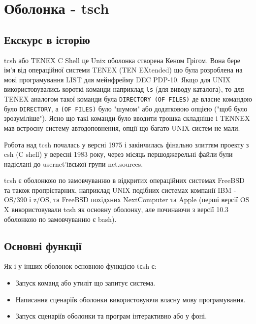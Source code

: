 \section{Оболонка - tsch}

  \subsection{Екскурс в історію}
  tcsh або TENEX C Shell це Unix оболонка створена Кеном Грігом. Вона бере ім'я від операційної системи TENEX (TEN EXtended) що була розроблена на мові програмування LIST для мейнфрейму DEC PDP-10. Якщо для UNIX використовувались короткі команди наприклад \texttt{ls} (для виводу каталога), то для TENEX аналогом такої команди була \texttt{DIRECTORY (OF FILES)} де власне командою було \texttt{DIRECTORY}, а \texttt{(OF FILES)} було "шумом" або додатковою опцією ("щоб було зрозуміліше"). Ясно що такі команди було вводити трошка складніше і TENNEX мав встроєну систему автодоповнення, опції що багато UNIX систем не мали.

  Робота над tcsh почалась у версні 1975 і закінчилась фінально злиттям проекту з csh (C shell) у вересні 1983 року, через місяць першоджерельні файли були надіслані до  usernet'івської групи net.sources.

  tcsh є оболонкою по замовчуванню в відкритих операційних системах FreeBSD та також пропрієтарних, наприклад UNIX подібних системах компанії IBM - OS/390 і z/OS, та FreeBSD похідхних NextComputer та Apple (перші версії OS X використовували tcsh як основну оболонку, але починаючи з версії 10.3 оболонкою по замовчуванню є bash).

  \subsection{Основні функції}
  Як і у інших оболонок основною функцією tсsh є:
  \begin{itemize}
    \item Запуск команд або утиліт що запитує система.
    \item Написання сценаріїв оболонки використовуючи власну мову програмування.
    \item Запуск сценаріїв оболонки та програм інтерактивно або у фоні.
    \end{itemize}

